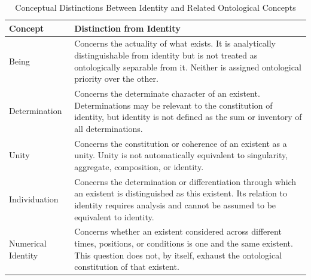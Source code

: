 %
%
%
%

\begin{table}[htbp]
\centering
\caption{Conceptual Distinctions Between Identity and Related Ontological Concepts}
\label{tab:identity-conceptual-distinctions}

\renewcommand{\arraystretch}{1.35}
\small

\begin{tabular}{|p{}|p{}|}
\hline
\textbf{Concept} & \textbf{Distinction from Identity} \\
\hline

Being
&
Concerns the actuality of what exists. It is
analytically distinguishable from identity but
is not treated as ontologically separable from it.
Neither is assigned ontological priority over
the other.
\\
\hline

Determination
&
Concerns the determinate character of an existent.
Determinations may be relevant to the constitution
of identity, but identity is not defined as the
sum or inventory of all determinations.
\\
\hline

Unity
&
Concerns the constitution or coherence of an
existent as a unity. Unity is not automatically
equivalent to singularity, aggregate, composition,
or identity.
\\
\hline

Individuation
&
Concerns the determination or differentiation
through which an existent is distinguished as
this existent. Its relation to identity requires
analysis and cannot be assumed to be equivalent
to identity.
\\
\hline

Numerical Identity
&
Concerns whether an existent considered across
different times, positions, or conditions is
one and the same existent. This question does
not, by itself, exhaust the ontological constitution
of that existent.
\\
\hline


\end{tabular}
\end{table}
